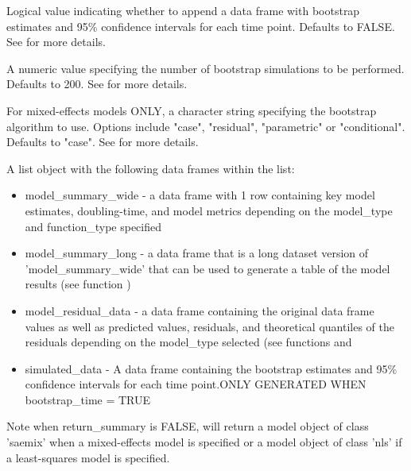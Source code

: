 \documentclass[a4paper]{book}
\begin{document}
\begin{Arguments}
\begin{ldescription}
\item[\code{bootstrap\_time}] Logical value indicating whether to append
a data frame with bootstrap estimates and 95\% confidence intervals for each
time point. Defaults to FALSE. See 
for more details.

\item[\code{boot\_n\_sim}] A numeric value specifying the number of bootstrap
simulations to be performed. Defaults to 200.
See  for more details.

\item[\code{mix\_boot\_method}] For mixed-effects models ONLY, a character string
specifying the bootstrap algorithm to use. Options include "case",
"residual", "parametric" or "conditional". Defaults to "case".
See  for more details.
\end{ldescription}
\end{Arguments}
%
\begin{Value}
A list object with the following data frames within the list:
\begin{itemize}

\item{} model\_summary\_wide - a data frame with 1 row containing
key model estimates, doubling-time, and model metrics depending
on the model\_type and function\_type specified
\item{} model\_summary\_long - a data frame that is a long dataset version of
'model\_summary\_wide' that can be used to generate a table of the model
results (see function )
\item{} model\_residual\_data - a data frame containing the original data
frame values as well as predicted values, residuals, and theoretical
quantiles of the residuals depending on the model\_type selected
(see functions  and
\item{} simulated\_data - A data frame containing the bootstrap estimates and
95\% confidence intervals for each time point.ONLY GENERATED WHEN
bootstrap\_time = TRUE

\end{itemize}

Note when return\_summary is FALSE, will return a model object of class
'saemix' when a mixed-effects model is specified or a model object of
class 'nls' if a least-squares model is specified.
\end{Value}
\end{document}
